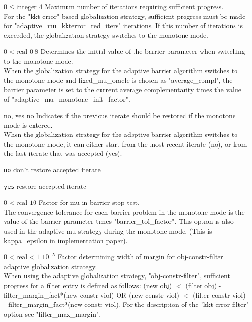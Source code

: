 %
{$0\leq\textrm{integer}$}%
{$4$}%
{Maximum number of iterations requiring sufficient progress.\\
For the "kkt-error" based globalization strategy, sufficient progress must be made for "adaptive\_mu\_kkterror\_red\_iters" iterations. If this number of iterations is exceeded, the globalization strategy switches to the monotone mode.}%
{}

%
{$0<\textrm{real}$}%
{$0.8$}%
{Determines the initial value of the barrier parameter when switching to the monotone mode.\\
When the globalization strategy for the adaptive barrier algorithm switches to the monotone mode and fixed\_mu\_oracle is chosen as "average\_compl", the barrier parameter is set to the current average complementarity times the value of "adaptive\_mu\_monotone\_init\_factor".}%
{}

%
{\ttfamily no, yes}%
{no}%
{Indicates if the previous iterate should be restored if the monotone mode is entered.\\
When the globalization strategy for the adaptive barrier algorithm switches to the monotone mode, it can either start from the most recent iterate (no), or from the last iterate that was accepted (yes).}%
{\begin{list}{}{
\setlength{\parsep}{0em}
\setlength{\leftmargin}{5ex}
\setlength{\labelwidth}{2ex}
\setlength{\itemindent}{0ex}
\setlength{\topsep}{0pt}}
\item[\texttt{no}] don't restore accepted iterate
\item[\texttt{yes}] restore accepted iterate
\end{list}
}

%
{$0<\textrm{real}$}%
{$10$}%
{Factor for mu in barrier stop test.\\
The convergence tolerance for each barrier problem in the monotone mode is the value of the barrier parameter times "barrier\_tol\_factor". This option is also used in the adaptive mu strategy during the monotone mode. (This is kappa\_epsilon in implementation paper).}%
{}

%
{$0<\textrm{real}<1$}%
{$10^{- 5}$}%
{Factor determining width of margin for obj-constr-filter adaptive globalization strategy.\\
When using the adaptive globalization strategy, "obj-constr-filter", sufficient progress for a filter entry is defined as follows: (new obj) $<$ (filter obj) - filter\_margin\_fact*(new constr-viol) OR (new constr-viol) $<$ (filter constr-viol) - filter\_margin\_fact*(new constr-viol).  For the description of the "kkt-error-filter" option see "filter\_max\_margin".}%
{}

